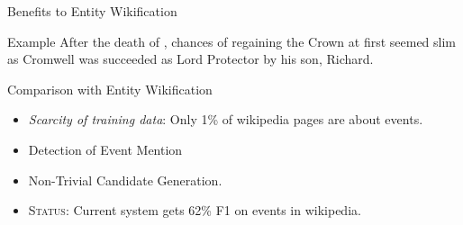 \begin{frame}{Benefits to Entity Wikification}
  \begin{block}{Example}
    After the { death of },  chances of regaining the Crown at first seemed slim as Cromwell was succeeded as Lord Protector by his son, Richard.
  \end{block}
\end{frame}

\begin{frame}{Comparison with Entity Wikification}
  \begin{itemize}[<+->]
  \item \emph{Scarcity of training data}: Only 1\% of wikipedia pages are about events.
  \item Detection of Event Mention
  \item Non-Trivial Candidate Generation.
  \item \textsc{Status:} Current system gets 62\% F1 on events in wikipedia.
  \end{itemize}
\end{frame}






